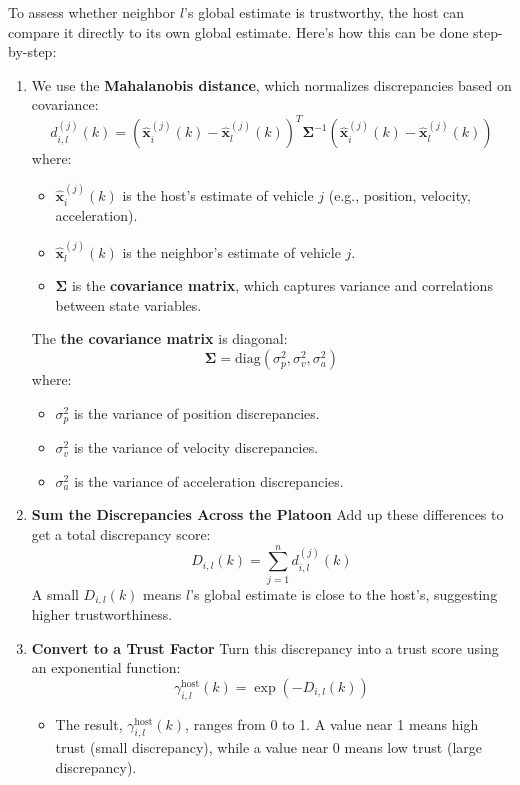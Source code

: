 \documentclass[letterpaper, 10pt, conference]{ieeeconf}  %
\begin{document}
To assess whether neighbor \( l \)'s global estimate is trustworthy, the host can compare it directly to its own global estimate. Here's how this can be done step-by-step:
\begin{enumerate}
    \item We use the \textbf{Mahalanobis distance}, which normalizes discrepancies based on covariance:
\[
d_{i,l}^{(j)}(k) = \left( \mathbf{\hat{x}}_i^{(j)}(k) - \mathbf{\hat{x}}_l^{(j)}(k) \right)^T \mathbf{\Sigma}^{-1} \left( \mathbf{\hat{x}}_i^{(j)}(k) - \mathbf{\hat{x}}_l^{(j)}(k) \right)
\]
where:
\begin{itemize}
    \item \( \mathbf{\hat{x}}_i^{(j)}(k) \) is the host's estimate of vehicle \( j \) (e.g., position, velocity, acceleration).
    \item \( \mathbf{\hat{x}}_l^{(j)}(k) \) is the neighbor's estimate of vehicle \( j \).
    \item \( \mathbf{\Sigma} \) is the \textbf{covariance matrix}, which captures variance and correlations between state variables.
\end{itemize}

The \textbf{the covariance matrix } is diagonal:
\[
\mathbf{\Sigma} = \text{diag}(\sigma^2_p, \sigma^2_v, \sigma^2_a)
\]
where:
\begin{itemize}
    \item \( \sigma^2_p \) is the variance of position discrepancies.
    \item \( \sigma^2_v \) is the variance of velocity discrepancies.
    \item \( \sigma^2_a \) is the variance of acceleration discrepancies.
\end{itemize}





    \item \textbf{Sum the Discrepancies Across the Platoon}  
    Add up these differences to get a total discrepancy score:
    \[
    D_{i,l}(k) = \sum_{j=1}^n d_{i,l}^{(j)}(k)
    \]
    A small \( D_{i,l}(k) \) means \( l \)'s global estimate is close to the host's, suggesting higher trustworthiness.

    \item \textbf{Convert to a Trust Factor}  
    Turn this discrepancy into a trust score using an exponential function:
    \[
    \gamma_{i,l}^{\text{host}}(k) = \exp\left( -{D_{i,l}(k)} \right)
    \]
    \begin{itemize}
        \item The result, \( \gamma_{i,l}^{\text{host}}(k) \), ranges from 0 to 1. A value near 1 means high trust (small discrepancy), while a value near 0 means low trust (large discrepancy).
    \end{itemize}
\end{enumerate}
\end{document}
